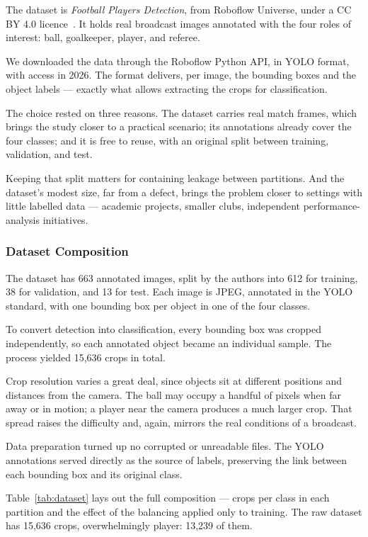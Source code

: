 \documentclass[preprint,12pt]{elsarticle}
\begin{document}
The dataset is \textit{Football Players Detection}, from Roboflow Universe, under a CC BY 4.0 licence~\cite{roboflow2024football}. It holds real broadcast images annotated with the four roles of interest: ball, goalkeeper, player, and referee.

We downloaded the data through the Roboflow Python API, in YOLO format, with access in 2026. The format delivers, per image, the bounding boxes and the object labels --- exactly what allows extracting the crops for classification.

The choice rested on three reasons. The dataset carries real match frames, which brings the study closer to a practical scenario; its annotations already cover the four classes; and it is free to reuse, with an original split between training, validation, and test.

Keeping that split matters for containing leakage between partitions. And the dataset's modest size, far from a defect, brings the problem closer to settings with little labelled data --- academic projects, smaller clubs, independent performance-analysis initiatives.

\subsubsection{Dataset Composition}

The dataset has 663 annotated images, split by the authors into 612 for training, 38 for validation, and 13 for test. Each image is JPEG, annotated in the YOLO standard, with one bounding box per object in one of the four classes.

To convert detection into classification, every bounding box was cropped independently, so each annotated object became an individual sample. The process yielded 15,636 crops in total.

Crop resolution varies a great deal, since objects sit at different positions and distances from the camera. The ball may occupy a handful of pixels when far away or in motion; a player near the camera produces a much larger crop. That spread raises the difficulty and, again, mirrors the real conditions of a broadcast.

Data preparation turned up no corrupted or unreadable files. The YOLO annotations served directly as the source of labels, preserving the link between each bounding box and its original class.

Table~\ref{tab:dataset} lays out the full composition --- crops per class in each partition and the effect of the balancing applied only to training. The raw dataset has 15,636 crops, overwhelmingly player: 13,239 of them.
\end{document}
